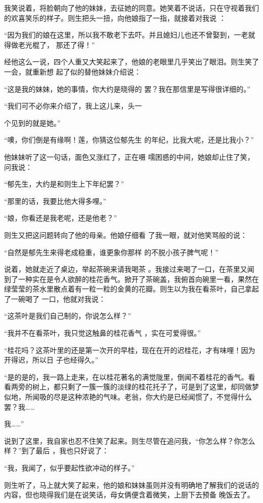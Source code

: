 \documentclass{article}
\begin{document}
我笑说着，将脸朝向了他的妹妹，去征她的同意。她笑着不说话，只在守视着我们的欢喜笑乐的样子。则生把头一扭，向他娘指了一指，就接着对我说
： 

“因为我们的娘在这里，所以我不敢老下去吓。并且媳妇儿也还不曾娶到，一老就得做老光棍了，
那还了得！” 

经他这么一说，四个人重又大笑起来了，他娘的老眼里几乎笑出了眼泪。则生笑了一会，就重新想
起了似的替他妹妹介绍说： 

“这是我的妹妹，她的事情，你大约是晓得的
罢？我在那信里是写得很详细的。” 

“我们可不必你来介绍了，我上这儿来，头一
\newpage

个见到的就是她。” 

“噢，你们倒是有缘啊！莲，你猜这位郁先生
的年纪，比我大呢，还是比我小？” 

他妹妹听了这一句话，面色又涨红了，正在嗫
嚅困惑的中间，她娘却止住了笑，问我说： 


“郁先生，大约是和则生上下年纪罢？” 


“那里的话，我要比他大得多哩。” 


“娘，你看还是我老呢，还是他老？” 

则生又把这问题转向了他的母亲。他娘仔细看
了我一眼，就对他笑骂般的说： 

“自然是郁先生来得老成稳重，谁更象你那样
的不脱小孩子脾气呢！” 

说着，她就走近了桌边，举起茶碗来请我喝茶
\newpage
。我接过来喝了一口，在茶里又闻到了一种实在是令人欲醉的桂花香气。掀开了茶碗盖，我俯首向碗里一看，果然在绿莹莹的茶水里散点着有一粒一粒的金黄的花瓣。则生以为我在看茶叶，自己拿起了一碗喝了
一口，他就对我说： 


“这茶叶是我们自己制的，你说怎么样？” 

“我并不在看茶叶，我只觉这触鼻的桂花香气
，实在可爱得很。” 

“桂花吗？这茶叶里的还是第一次开的早桂，现在在开的迟桂花，才有味哩！因为开得迟，所以日
子也经得久。” 

“是的是的，我一路上走来，在以桂花著名的满觉陇里，倒闻不着桂花的香气。看看两旁的树上，都只剩了一簇一簇的淡绿的桂花托子了，可是到了这里，却同做梦似地，所闻吸的尽是这种浓艳的气味。老翁，你大约是已经闻惯了，不觉得什么罢？我……

\newpage
我……” 

说到了这里，我自家也忍不住笑了起来。则生尽管在追问我，“你怎么样？你怎么样？”到了最后
，我也只好说了： 

“我，我闻了，似乎要起性欲冲动的样子。”

则生听了，马上就大笑了起来，他的娘和妹妹虽则并没有明确地了解我们的说话的内容，但也晓得我们是在说笑话，母女俩便含着微笑，上厨下去预备
晚饭去了。 
\end{document}
